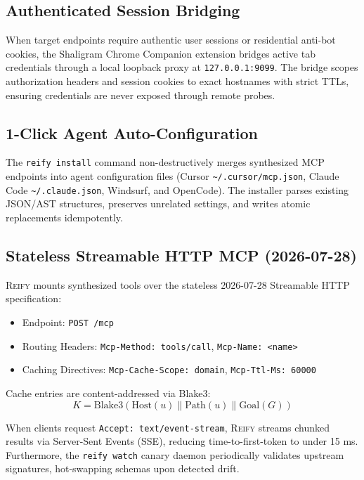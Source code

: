 \documentclass[10pt,twocolumn]{article}
\begin{document}
\subsection{Authenticated Session Bridging}
When target endpoints require authentic user sessions or residential anti-bot cookies, the Shaligram Chrome Companion extension bridges active tab credentials through a local loopback proxy at \texttt{127.0.0.1:9099}. The bridge scopes authorization headers and session cookies to exact hostnames with strict TTLs, ensuring credentials are never exposed through remote probes.

\subsection{1-Click Agent Auto-Configuration}
The \texttt{reify install} command non-destructively merges synthesized MCP endpoints into agent configuration files (Cursor \texttt{\textasciitilde/.cursor/mcp.json}, Claude Code \texttt{\textasciitilde/.claude.json}, Windsurf, and OpenCode). The installer parses existing JSON/AST structures, preserves unrelated settings, and writes atomic replacements idempotently.

\subsection{Stateless Streamable HTTP MCP (2026-07-28)}
\textsc{Reify} mounts synthesized tools over the stateless 2026-07-28 Streamable HTTP specification:
\begin{itemize}
    \item Endpoint: \texttt{POST /mcp}
    \item Routing Headers: \texttt{Mcp-Method: tools/call}, \texttt{Mcp-Name: <name>}
    \item Caching Directives: \texttt{Mcp-Cache-Scope: domain}, \texttt{Mcp-Ttl-Ms: 60000}
\end{itemize}
Cache entries are content-addressed via Blake3:
\begin{equation}
    K = \text{Blake3}(\text{Host}(u) \parallel \text{Path}(u) \parallel \text{Goal}(G))
\end{equation}

When clients request \texttt{Accept: text/event-stream}, \textsc{Reify} streams chunked results via Server-Sent Events (SSE), reducing time-to-first-token to under 15 ms. Furthermore, the \texttt{reify watch} canary daemon periodically validates upstream signatures, hot-swapping schemas upon detected drift.
\end{document}

